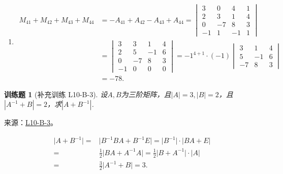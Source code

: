 \documentclass[UTF8,12pt,a4paper,fontset=fandol]{ctexart}
\newtheorem{exercise}{训练题}[section]
\begin{document}
\begin{solve}
\begin{enumerate}
                \item \begin{align*}
                            M_{41}+M_{42}+M_{43}+M_{44}
                            & = -A_{41}+A_{42}-A_{43}+A_{44}
                            = \begin{vmatrix}
                                3  & 0  & 4  & 1 \\
                                2  & 3  & 1  & 4 \\
                                0  & -7 & 8  & 3 \\
                                -1 & 1  & -1 & 1
                            \end{vmatrix}                     \\
                            & = \begin{vmatrix}
                                    3  & 3  & 1  & 4 \\
                                    2  & 5  & -1 & 6 \\
                                    0  & -7 & 8  & 3 \\
                                    -1 & 0  & 0  & 0
                                \end{vmatrix}
                            = {-1}^{4+1} \cdot (-1) \begin{vmatrix}
                                                        3  & 1  & 4 \\
                                                        5  & -1 & 6 \\
                                                        -7 & 8  & 3
                                                    \end{vmatrix} \\
                            & = -78.
                        \end{align*}
            \end{enumerate}
\end{solve}

\begin{exercise}[补充训练 L10-B-3]\label{prob:L10-B-3}
设$A,B$为三阶矩阵，且$|A|=3,|B|=2$，且$|A^{-1}+B|=2$，求$|A+B^{-1}|$.
\end{exercise}
\noindent 来源：\href{https://github.com/yhwu-is/Linear-Algebra-Left-Undone/blob/new/%E8%AE%B2%E4%B9%89/%E4%B8%93%E9%A2%98/10%20%E8%A1%8C%E5%88%97%E5%BC%8F.tex}{L10-B-3}。
\begin{solve}
\begin{align*}
                \lvert A+B^{-1} \rvert ={} & \lvert B^{-1}BA+B^{-1}E \rvert = \lvert B^{-1} \rvert \cdot \lvert BA+E \rvert                  \\
                ={}                        & \frac{1}{2} \lvert BA+A^{-1}A \rvert = \frac{1}{2} \lvert B+A^{-1} \rvert \cdot \lvert A \rvert \\
                ={}                        & \frac{3}{2} \lvert A^{-1}+B \rvert = 3.
            \end{align*}
\end{solve}
\end{document}
